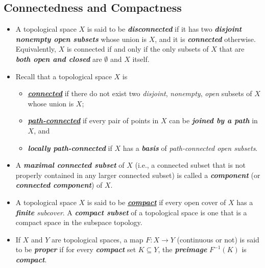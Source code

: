 \documentclass[11pt]{article}
\begin{document}
\subsection{Connectedness and Compactness}
\begin{itemize}
\item  \begin{definition} 
A topological space $X$ is said to be \emph{\textbf{disconnected}} if it has two \emph{\textbf{disjoint nonempty open subsets}} whose union is $X$, and it is \emph{\textbf{connected}} otherwise.  Equivalently, $X$ is connected if and only if the only subsets of $X$ that are \emph{\textbf{both open and closed}} are $\emptyset$
and $X$ itself.
\end{definition}

\item \begin{definition}
Recall that a topological space $X$ is
\begin{itemize}
\item \underline{\emph{\textbf{connected}}} if there do not exist two \emph{disjoint}, \emph{nonempty}, \emph{open} subsets of $X$ whose union is $X$;
\item \underline{\emph{\textbf{path-connected}}} if every pair of points in $X$ can be \emph{\textbf{joined by a path}} in $X$, and
\item \emph{\textbf{locally path-connected}} if $X$ has a \emph{\textbf{basis}} of \emph{path-connected open subsets}.
\end{itemize}
\end{definition}

\item \begin{definition}
A \emph{\textbf{maximal connected subset}} of $X$ (i.e., a connected subset that is not properly contained in any larger connected subset) is called a \emph{\textbf{component}} (or \emph{\textbf{connected component}}) of $X$.
\end{definition}

\item \begin{definition}
A topological space $X$ is said to be \underline{\emph{\textbf{compact}}} if every open cover of $X$ has a \emph{\textbf{finite} subcover}. A \emph{\textbf{compact subset}} of a topological space is one that is a compact space in the subspace topology. 
\end{definition}

\item \begin{definition}
If $X$ and $Y$ are topological spaces, a map $F: X \rightarrow Y$ (continuous or not) is said to be \emph{\textbf{proper}} if for every \textbf{\emph{compact}} set $K \subseteq Y$, the \emph{\textbf{preimage}} $F^{-1}(K)$ is \emph{\textbf{compact}}.
\end{definition}


\end{itemize}
\end{document}
